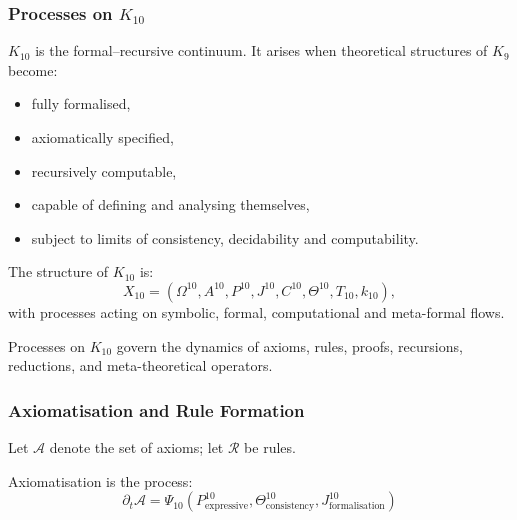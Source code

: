 

\subsubsection{Processes on $K_{10}$}
\label{sec:processes-k10}

$K_{10}$ is the formal–recursive continuum.  
It arises when theoretical structures of $K_{9}$ become:
\begin{itemize}
    \item fully formalised,
    \item axiomatically specified,
    \item recursively computable,
    \item capable of defining and analysing themselves,
    \item subject to limits of consistency, decidability and computability.
\end{itemize}

The structure of $K_{10}$ is:
\[
X_{10} = (\Omega^{10}, A^{10}, P^{10}, J^{10}, C^{10}, 
          \Theta^{10}, T_{10}, k_{10}),
\]
with processes acting on symbolic, formal, computational and meta-formal flows.

Processes on $K_{10}$ govern the dynamics of axioms, rules, proofs, 
recursions, reductions, and meta-theoretical operators.

\subsubsection{Axiomatisation and Rule Formation}

Let $\mathcal{A}$ denote the set of axioms; let $\mathcal{R}$ be rules.

Axiomatisation is the process:
\[
\partial_t \mathcal{A} 
= \Psi_{10}(P^{10}_{\text{expressive}}, 
            \Theta^{10}_{\text{consistency}},
            J^{10}_{\text{formalisation}})
\]

